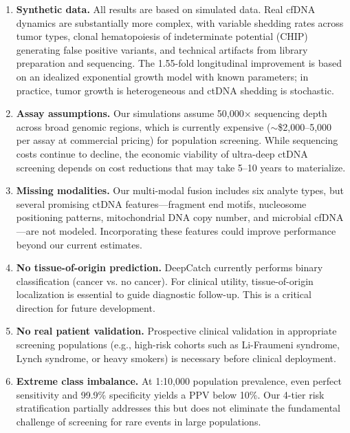 \documentclass[10pt,a4paper]{article}
\begin{document}
\begin{enumerate}
\item \textbf{Synthetic data.} All results are based on simulated data. Real cfDNA dynamics are substantially more complex, with variable shedding rates across tumor types, clonal hematopoiesis of indeterminate potential (CHIP) generating false positive variants, and technical artifacts from library preparation and sequencing. The 1.55-fold longitudinal improvement is based on an idealized exponential growth model with known parameters; in practice, tumor growth is heterogeneous and ctDNA shedding is stochastic.

\item \textbf{Assay assumptions.} Our simulations assume 50,000$\times$ sequencing depth across broad genomic regions, which is currently expensive ($\sim$\$2,000--5,000 per assay at commercial pricing) for population screening. While sequencing costs continue to decline, the economic viability of ultra-deep ctDNA screening depends on cost reductions that may take 5--10 years to materialize.

\item \textbf{Missing modalities.} Our multi-modal fusion includes six analyte types, but several promising ctDNA features—fragment end motifs, nucleosome positioning patterns, mitochondrial DNA copy number, and microbial cfDNA—are not modeled. Incorporating these features could improve performance beyond our current estimates.

\item \textbf{No tissue-of-origin prediction.} DeepCatch currently performs binary classification (cancer vs. no cancer). For clinical utility, tissue-of-origin localization is essential to guide diagnostic follow-up. This is a critical direction for future development.

\item \textbf{No real patient validation.} Prospective clinical validation in appropriate screening populations (e.g., high-risk cohorts such as Li-Fraumeni syndrome, Lynch syndrome, or heavy smokers) is necessary before clinical deployment.

\item \textbf{Extreme class imbalance.} At 1:10,000 population prevalence, even perfect sensitivity and 99.9\% specificity yields a PPV below 10\%. Our 4-tier risk stratification partially addresses this but does not eliminate the fundamental challenge of screening for rare events in large populations.
\end{enumerate}
\end{document}
